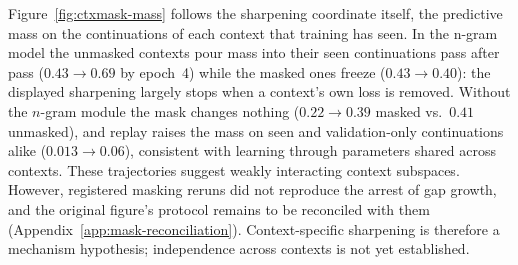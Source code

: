 Figure~\ref{fig:ctxmask-mass} follows the sharpening coordinate itself, the predictive mass on the continuations of each context that training has seen. In the n-gram model the unmasked contexts pour mass into their seen continuations pass after pass ($0.43\to0.69$ by epoch~4) while the masked ones freeze ($0.43\to0.40$): the displayed sharpening largely stops when a context's own loss is removed. Without the $n$-gram module the mask changes nothing ($0.22\to0.39$ masked vs.\ $0.41$ unmasked), and replay raises the mass on seen and validation-only continuations alike ($0.013\to0.06$), consistent with learning through parameters shared across contexts. These trajectories suggest weakly interacting context subspaces. However, registered masking reruns did not reproduce the arrest of gap growth, and the original figure's protocol remains to be reconciled with them (Appendix~\ref{app:mask-reconciliation}). Context-specific sharpening is therefore a mechanism hypothesis; independence across contexts is not yet established.

